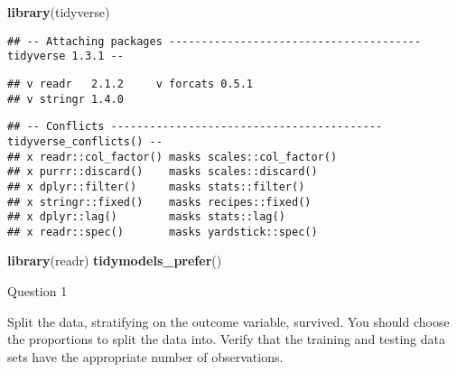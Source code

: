 \documentclass[]{article}
\newenvironment{Shaded}{\begin{snugshade}}{\end{snugshade}}
\newcommand{\DataTypeTok}[1]{\textcolor[rgb]{0.13,0.29,0.53}{#1}}
\newcommand{\KeywordTok}[1]{\textcolor[rgb]{0.13,0.29,0.53}{\textbf{#1}}}
\newcommand{\NormalTok}[1]{#1}
\newcommand{\OperatorTok}[1]{\textcolor[rgb]{0.81,0.36,0.00}{\textbf{#1}}}
\newcommand{\StringTok}[1]{\textcolor[rgb]{0.31,0.60,0.02}{#1}}
\begin{document}
\begin{Shaded}
\begin{Highlighting}[]
\KeywordTok{library}\NormalTok{(tidyverse)}
\end{Highlighting}
\end{Shaded}

\begin{verbatim}
## -- Attaching packages --------------------------------------- tidyverse 1.3.1 --
\end{verbatim}

\begin{verbatim}
## v readr   2.1.2     v forcats 0.5.1
## v stringr 1.4.0
\end{verbatim}

\begin{verbatim}
## -- Conflicts ------------------------------------------ tidyverse_conflicts() --
## x readr::col_factor() masks scales::col_factor()
## x purrr::discard()    masks scales::discard()
## x dplyr::filter()     masks stats::filter()
## x stringr::fixed()    masks recipes::fixed()
## x dplyr::lag()        masks stats::lag()
## x readr::spec()       masks yardstick::spec()
\end{verbatim}

\begin{Shaded}
\begin{Highlighting}[]
\KeywordTok{library}\NormalTok{(readr)}
\KeywordTok{tidymodels_prefer}\NormalTok{()}
\end{Highlighting}
\end{Shaded}

Question 1

Split the data, stratifying on the outcome variable, survived. You
should choose the proportions to split the data into. Verify that the
training and testing data sets have the appropriate number of
observations.

\begin{Shaded}
\end{Shaded}
\end{document}
